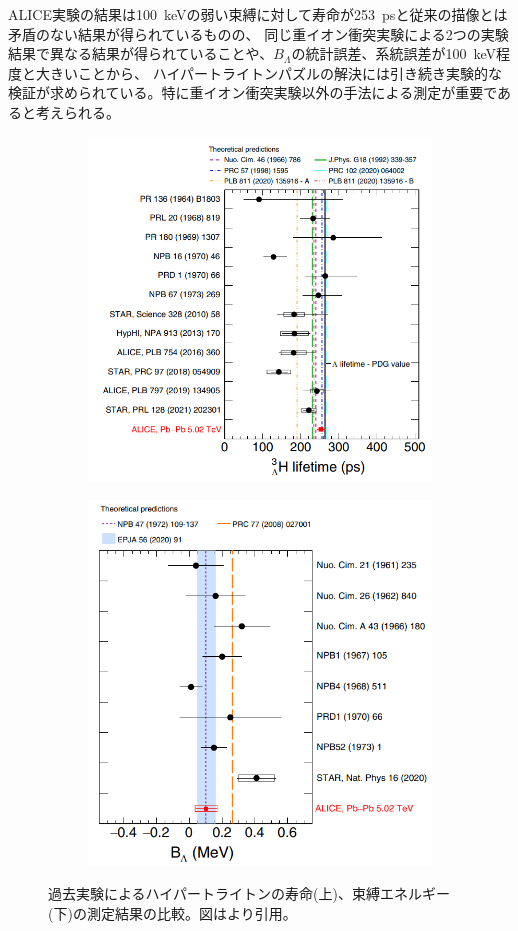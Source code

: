 \documentclass[a4paper,11pt,uplatex]{jsbook}
\begin{document}
ALICE実験の結果は100~keVの弱い束縛に対して寿命が253~psと従来の描像とは矛盾のない結果が得られているものの、
同じ重イオン衝突実験による2つの実験結果で異なる結果が得られていることや、$B_{\Lambda}$の統計誤差、系統誤差が100~keV程度と大きいことから、
ハイパートライトンパズルの解決には引き続き実験的な検証が求められている。特に重イオン衝突実験以外の手法による測定が重要であると考えられる。

\begin{figure}[H]
  \centering
  \begin{subfigure}{0.8\linewidth}
    \centering
    \includegraphics[width=10cm]{image/1-lifetime.png}
  \end{subfigure}
  \begin{subfigure}{0.8\linewidth}
    \centering
    \includegraphics[width=10cm]{image/1-binding.png}
  \end{subfigure}
  \caption[過去のハイパートライトンの寿命測定及び束縛エネルギー測定実験]{過去実験によるハイパートライトンの寿命(上)、束縛エネルギー(下)の測定結果の比較。図は\cite{ALICE}より引用。}\label{fig:hypertriton}
\end{figure}
\end{document}
